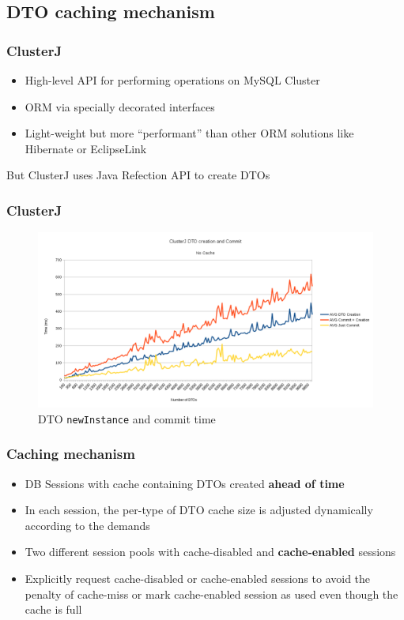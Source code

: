 \documentclass{beamer}
\begin{document}
\subsection{DTO caching mechanism}
\begin{frame}
\frametitle{ClusterJ}

\begin{itemize}
\item High-level API for performing operations on MySQL Cluster
\item ORM via specially decorated interfaces
\item Light-weight but more ``performant'' than other ORM solutions
  like Hibernate or EclipseLink
\end{itemize}

\pause
\centering
\vfill
{\color{red} But ClusterJ uses Java Refection API to create DTOs}
\end{frame}

\begin{frame}
\frametitle{ClusterJ}

\begin{figure}
\centering
\includegraphics[scale=0.3]{resources/dto_create_commit_no_cache.png}
\caption{DTO \texttt{newInstance} and commit time}
\end{figure}
\end{frame}

\begin{frame}
\frametitle{Caching mechanism}

\begin{itemize}
\item DB Sessions with cache containing DTOs created \textbf{ahead of
    time}

\item In each session, the per-type of DTO cache size is adjusted dynamically
  according to the demands

\item Two different session pools with cache-disabled and
  \textbf{cache-enabled} sessions

\item Explicitly request cache-disabled or cache-enabled sessions to
  avoid the penalty of cache-miss or mark cache-enabled session as
  used even though the cache is full

\end{itemize}
\end{frame}
\end{document}
